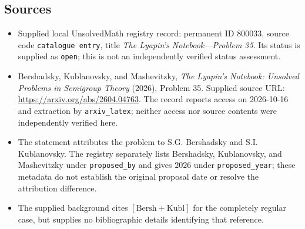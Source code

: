 \documentclass[11pt]{article}
\begin{document}
\subsection{Sources}
\begin{itemize}
\item Supplied local UnsolvedMath registry record: permanent ID \(800033\), source code \texttt{catalogue entry}, title \emph{The Lyapin's Notebook---Problem 35}. Its status is supplied as \texttt{open}; this is not an independently verified status assessment.
\item Bershadsky, Kublanovsky, and Mashevitzky, \emph{The Lyapin's Notebook: Unsolved Problems in Semigroup Theory} (2026), Problem 35. Supplied source URL: \url{https://arxiv.org/abs/2604.04763}. The record reports access on 2026-10-16 and extraction by \texttt{arxiv\_latex}; neither access nor source contents were independently verified here.
\item The statement attributes the problem to S.G. Bershadsky and S.I. Kublanovsky. The registry separately lists Bershadsky, Kublanovsky, and Mashevitzky under \texttt{proposed\_by} and gives \(2026\) under \texttt{proposed\_year}; these metadata do not establish the original proposal date or resolve the attribution difference.
\item The supplied background cites \([\mathrm{Bersh+Kubl}]\) for the completely regular case, but supplies no bibliographic details identifying that reference.
\end{itemize}
\end{document}

